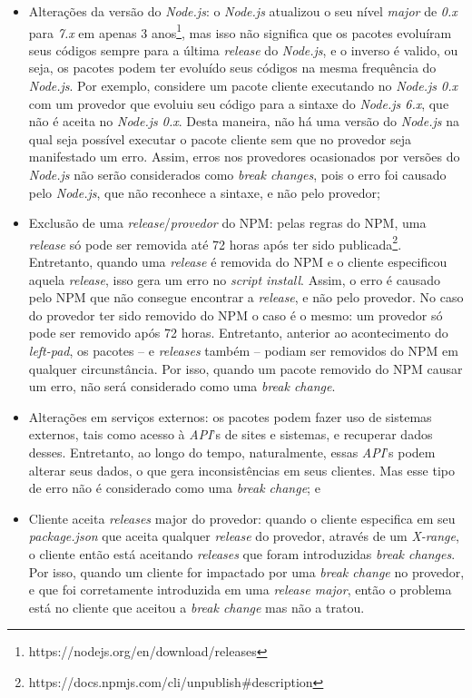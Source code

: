 \begin{itemize}
    \item Alterações da versão do \textit{Node.js}: o \textit{Node.js} atualizou o seu nível \textit{major} de \textit{0.x} para \textit{7.x} em apenas 3 anos\footnote{https://nodejs.org/en/download/releases}, mas isso não significa que os pacotes evoluíram seus códigos sempre para a última \textit{release} do \textit{Node.js}, e o inverso é valido, ou seja, os pacotes podem ter evoluído seus códigos na mesma frequência do \textit{Node.js}. Por exemplo, considere um pacote cliente executando no \textit{Node.js 0.x} com um provedor que evoluiu seu código para a sintaxe do \textit{Node.js 6.x}, que não é aceita no \textit{Node.js 0.x}. Desta maneira, não há uma versão do \textit{Node.js}  na qual seja possível executar o pacote cliente sem que no provedor seja manifestado um erro. Assim, erros nos provedores ocasionados por versões do \textit{Node.js} não serão considerados como \textit{break changes}, pois o erro foi causado pelo \textit{Node.js}, que não reconhece a sintaxe, e não pelo provedor;
    \item Exclusão de uma \textit{release}/\textit{provedor} do \gls{NPM}: pelas regras do \gls{NPM}, uma \textit{release} só pode ser removida até 72 horas após ter sido publicada\footnote{https://docs.npmjs.com/cli/unpublish\#description}. Entretanto, quando uma \textit{release} é removida do \gls{NPM} e o cliente especificou aquela \textit{release}, isso gera um erro no \textit{script install}. Assim, o erro é causado pelo \gls{NPM} que não consegue encontrar a \textit{release}, e não pelo provedor. No caso do provedor ter sido removido do \gls{NPM} o caso é o mesmo: um provedor só pode ser removido após 72 horas. Entretanto, anterior ao acontecimento do \textit{left-pad}, os pacotes -- e \textit{releases} também -- podiam ser removidos do \gls{NPM} em qualquer circunstância. Por isso, quando um pacote removido do \gls{NPM} causar um erro, não será considerado como uma \textit{break change}.
    \item Alterações em serviços externos: os pacotes podem fazer uso de sistemas externos, tais como acesso à \textit{API}'s de sites e sistemas, e recuperar dados desses. Entretanto, ao longo do tempo, naturalmente, essas \textit{API}'s podem alterar seus dados, o que gera inconsistências em seus clientes. Mas esse tipo de erro não é considerado como uma \textit{break change}; e
    \item Cliente aceita \textit{releases} major do provedor: quando o cliente especifica em seu \textit{package.json} que aceita qualquer \textit{release} do provedor, através de um \textit{X-range}, o cliente então está aceitando \textit{releases} que foram introduzidas \textit{break changes}. Por isso, quando um cliente for impactado por uma \textit{break change} no provedor, e que foi corretamente introduzida em uma \textit{release major}, então o problema está no cliente que aceitou a \textit{break change} mas não a tratou.
\end{itemize}{}